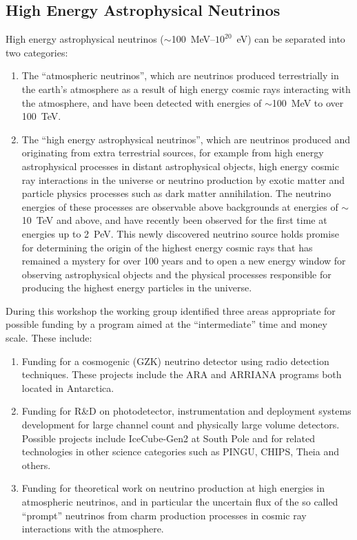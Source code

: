 \subsection{High Energy Astrophysical Neutrinos}
\label{sec:Astrophysical_high}

High energy astrophysical neutrinos ($\sim$100~MeV--$10^{20}$~eV) can be
separated into two categories: 
\begin{enumerate}
  \item The ``atmospheric neutrinos'', which are neutrinos produced terrestrially in the earth's
atmosphere as a result of high energy cosmic rays interacting with the
atmosphere, and have been detected with energies of $\sim$100~MeV to over
100~TeV. 
   \item The ``high energy astrophysical neutrinos'', which are
neutrinos produced and originating from extra terrestrial sources, for
example from high energy astrophysical processes in distant
astrophysical objects, high energy cosmic ray interactions in the
universe or neutrino production by exotic matter and particle physics
processes such as dark matter annihilation. The neutrino energies of
these processes are observable above backgrounds at energies of
$\sim$10~TeV and above, and have recently been observed for the first
time at energies up to 2~PeV. This newly discovered neutrino source
holds promise for determining the origin of the highest energy cosmic
rays that has remained a mystery for over 100 years and to open a new
energy window for observing astrophysical objects and the physical
processes responsible for producing the highest energy particles in
the universe.
\end{enumerate}

During this workshop the working group identified three areas
appropriate for possible funding by a program aimed at the
``intermediate'' time and money scale. These include: 
\begin{enumerate}
  \item Funding for a cosmogenic (GZK) neutrino detector using radio detection
techniques. These projects include the ARA and ARRIANA programs both
located in Antarctica.
  \item Funding for R\&D on photodetector,
instrumentation and deployment systems development for large channel
count and physically large volume detectors. Possible projects include
IceCube-Gen2 at South Pole and for related technologies in other
science categories such as PINGU, CHIPS, Theia and others. 
  \item Funding for theoretical work on neutrino production at high energies in
atmospheric neutrinos, and in particular the uncertain flux of the so
called ``prompt'' neutrinos from charm production processes in
cosmic ray interactions with the atmosphere.
\end{enumerate}



